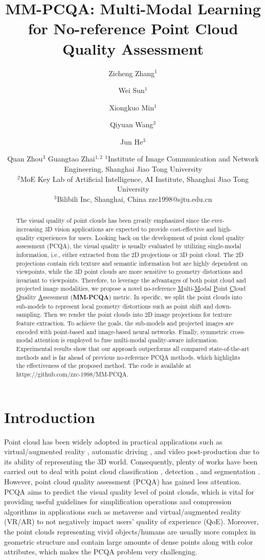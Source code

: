 \documentclass{article}
\title{MM-PCQA: Multi-Modal Learning for No-reference Point Cloud Quality Assessment}
\author{
Zicheng Zhang$^1$
\and
Wei Sun$^1$\and
Xiongkuo Min$^1$\and
Qiyuan Wang$^3$\and
Jun He$^3$ \and
Quan Zhou$^3$ \And
Guangtao Zhai$^{1,2}$
\affiliations
$^1$Institute of Image Communication and Network Engineering, Shanghai Jiao Tong University\\
$^2$MoE Key Lab of Artificial Intelligence, AI Institute, Shanghai Jiao Tong University\\
$^3$Bilibili Inc, Shanghai, China
\emails
zzc1998@sjtu.edu.cn
}
\begin{document}
\maketitle



\begin{abstract}
    The visual quality of point clouds has been greatly emphasized since the ever-increasing 3D vision applications are expected to provide cost-effective and high-quality experiences for users.  Looking back on the development of point cloud quality assessment (PCQA), the visual quality is usually evaluated by utilizing single-modal information, i.e., either extracted from the 2D projections or 3D point cloud. The 2D projections contain rich texture and semantic information but are highly dependent on viewpoints, while the 3D point clouds are more sensitive to geometry distortions and invariant to viewpoints. Therefore, to leverage the advantages of both point cloud and projected image modalities, we propose a novel no-reference \underline{M}ulti-\underline{M}odal \underline{P}oint \underline{C}loud \underline{Q}uality \underline{A}ssessment (\textbf{MM-PCQA}) metric. In specific, we split the point clouds into sub-models to represent local geometry distortions such as point shift and down-sampling. Then we render the point clouds into 2D image projections for texture feature extraction. To achieve the goals, the sub-models and projected images are encoded with point-based and image-based neural networks. Finally, symmetric cross-modal attention is employed to fuse multi-modal quality-aware information. Experimental results show that our approach outperforms all compared state-of-the-art methods and is far ahead of previous no-reference PCQA methods, which highlights the effectiveness of the proposed method. The code is available at https://github.com/zzc-1998/MM-PCQA.
\end{abstract}

\section{Introduction}
Point cloud has been widely adopted in practical applications such as virtual/augmented reality \cite{park2008multiple}, automatic driving \cite{cui2021deep}, and video post-production \cite{mekuria2016design} due to its ability of representing the 3D world. Consequently, plenty of works have been carried out to deal with point cloud classification \cite{grilli2017review,ku2018joint,wang2019frustum,vora2020pointpainting,xie2020pi,yoo20203d,chen2020object}, detection \cite{cui2021deep}, and segmentation \cite{cheng2021sspc,liutoposeg}. However, point cloud quality assessment (PCQA) has gained less attention. PCQA aims to predict the visual quality level of point clouds, which is vital for providing useful guidelines for simplification operations and compression algorithms in applications such as metaverse and virtual/augmented reality (VR/AR) \cite{fan2022d} to not negatively impact users' quality of experience (QoE). Moreover, the point clouds representing vivid objects/humans are usually more complex in geometric structure and contain large amounts of dense points along with color attributes, which makes the PCQA problem very challenging. 
\end{document}
